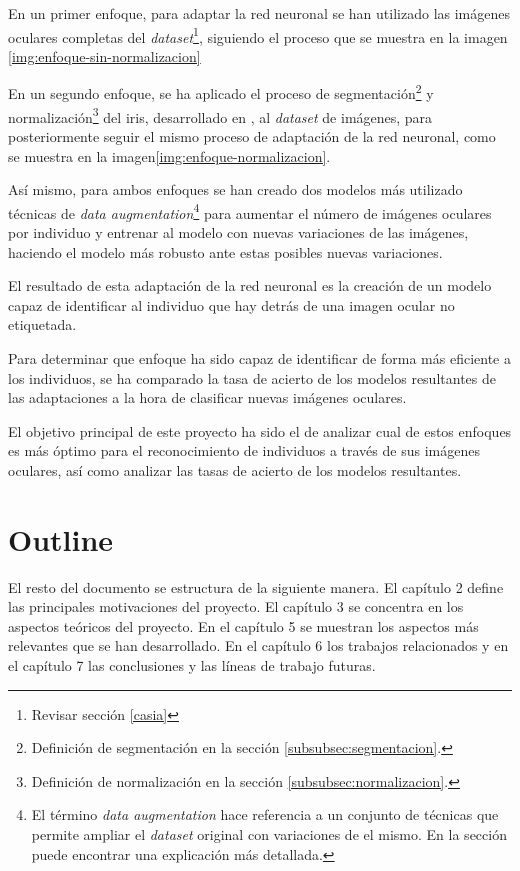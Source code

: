 En un primer enfoque, para adaptar la red neuronal se han utilizado las imágenes oculares completas del \textit{dataset}\footnote{Revisar sección \ref{casia}}, siguiendo el proceso que se muestra en la imagen \ref{img:enfoque-sin-normalizacion}



En un segundo enfoque, se ha aplicado el proceso de segmentación\footnote{Definición de segmentación en la sección \ref{subsubsec:segmentacion}.} y normalización\footnote{Definición de normalización en la sección \ref{subsubsec:normalizacion}.} del iris, desarrollado en \cite{tfg_iris_2020}, al \textit{dataset} de imágenes, para posteriormente seguir el mismo proceso de adaptación de la red neuronal, como se muestra en la imagen\ref{img:enfoque-normalizacion}.



Así mismo, para ambos enfoques se han creado dos modelos más utilizado técnicas de \textit{data augmentation}\footnote{El término \textit{data augmentation} hace referencia a un conjunto de técnicas que permite ampliar el \textit{dataset} original con variaciones de el mismo. En la sección  puede encontrar una explicación más detallada.} para aumentar el número de imágenes oculares por individuo y entrenar al modelo con nuevas variaciones de las imágenes, haciendo el modelo más robusto ante estas posibles nuevas variaciones.

El resultado de esta adaptación de la red neuronal es la creación de un modelo capaz de identificar al individuo que hay detrás de una imagen ocular no etiquetada. 

Para determinar que enfoque ha sido capaz de identificar de forma más eficiente a los individuos, se ha comparado la tasa de acierto de los modelos resultantes de las adaptaciones a la hora de clasificar nuevas imágenes oculares. 

El objetivo principal de este proyecto ha sido el de analizar cual de estos enfoques es más óptimo para el reconocimiento de individuos a través de sus imágenes oculares, así como analizar las tasas de acierto de los modelos resultantes.

\section{Outline}

El resto del documento se estructura de la siguiente manera. El capítulo 2  define las principales motivaciones del proyecto. El capítulo 3  se concentra en los aspectos teóricos del proyecto. En el capítulo 5  se muestran los aspectos
más relevantes que se han desarrollado. En el capítulo 6  los trabajos relacionados y en el capítulo 7  las conclusiones y las líneas de trabajo futuras.

